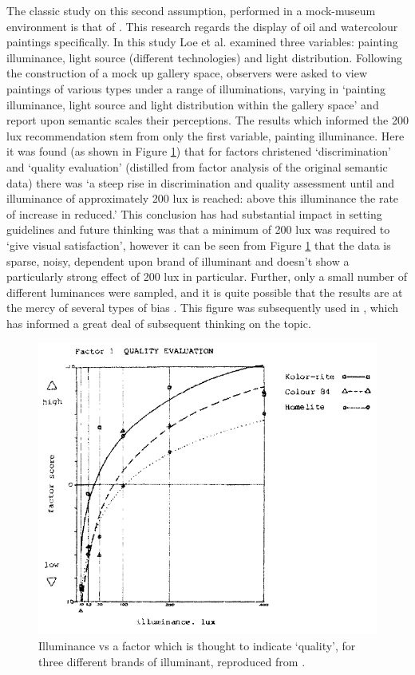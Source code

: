The classic study on this second assumption, performed in a mock-museum environment is that of \citet{loe_preferred_1982}. This research regards the display of oil and watercolour paintings specifically. In this study Loe et al. examined three variables: painting illuminance, light source (different technologies) and light distribution. Following the construction of a mock up gallery space, observers were asked to view paintings of various types under a range of illuminations, varying in `painting illuminance, light source and light distribution within the gallery space' and report upon semantic scales their perceptions. The results which informed the 200 lux recommendation stem from only the first variable, painting illuminance. Here it was found (as shown in Figure \ref{fig:Loe}) that for factors christened `discrimination' and `quality evaluation' (distilled from factor analysis of the original semantic data) there was `a steep rise in discrimination and quality assessment until and illuminance of approximately 200 lux is reached: above this illuminance the rate of increase in reduced.' This conclusion has had substantial impact in setting guidelines and future thinking was that a minimum of 200 lux was required to `give visual satisfaction', however it can be seen from Figure \ref{fig:Loe} that the data is sparse, noisy, dependent upon brand of illuminant and doesn't show a particularly strong effect of 200 lux in particular. Further, only a small number of different luminances were sampled, and it is quite possible that the results are at the mercy of several types of bias \citep{fotios_research_2009}. This figure was subsequently used in \citet{thomson_museum_1978}, which has informed a great deal of subsequent thinking on the topic.

\begin{figure}[htbp]
\includegraphics[max width=\textwidth]{figs/LitRev/Loe.png}
\caption{Illuminance vs a factor which is thought to indicate `quality', for three different brands of illuminant, reproduced from \citet{loe_preferred_1982}.}
\label{fig:Loe}
\end{figure}

